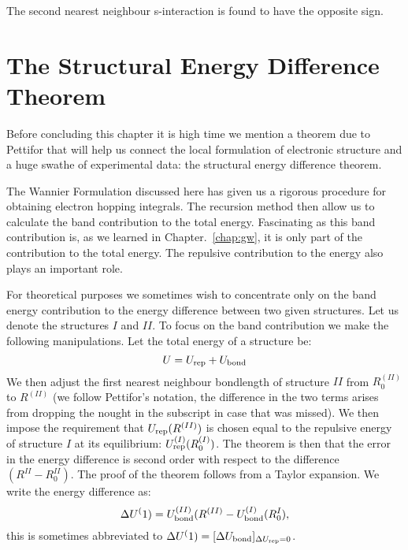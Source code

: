 The second nearest neighbour s-interaction is found to have the opposite sign.

\section{The Structural Energy Difference Theorem}
\label{sec:structendiff}
Before concluding this chapter it is high time we mention a theorem due to Pettifor
that will help us connect the local formulation of electronic structure and
a huge swathe of experimental data: the structural energy difference theorem. 

The Wannier Formulation discussed here has given
us a rigorous procedure for obtaining electron hopping integrals.
The recursion method then allow us to calculate the band contribution to the total energy.
Fascinating as this band contribution is, as we learned in Chapter.~\ref{chap:gw}, 
it is only part of the contribution to the total energy. The repulsive contribution to the energy
also plays an important role. 

For theoretical purposes we sometimes wish to concentrate only on the band energy 
contribution to the energy difference between two given structures. 
Let us denote the structures $I$ and $II$. To focus on the band contribution we make
the following manipulations. Let the total energy of a structure be:
%
\begin{equation}
U = U_{\rm rep} + U_{\rm bond}
\end{equation}
%
We then adjust the first nearest neighbour bondlength of structure $II$ from
$R^{(II)}_{0}$ to $R^{(II)}$ (we follow Pettifor's notation, the difference in the two terms
arises from dropping the nought in the subscript in case that was missed). 
We then impose the requirement that $U_{\rm rep}(R^{(II)})$ is chosen 
equal to the repulsive energy of structure $I$ at its equilibrium: $U^{(I)}_{\rm rep}(R^{(I)}_0)$.
The theorem is then that the error in the energy difference is second order with respect to the 
difference $(R^{II} - R^{II}_{0})$. The proof of the theorem follows from a Taylor expansion. 
We write the energy difference as:
%
\begin{equation}
\Delta U^(1) = U^{(II)}_{\rm bond}(R^{(II)} - U_{\rm bond}^{(I)}(R^{I}_{0}),
\end{equation}
%
this is sometimes abbreviated to $\Delta U^(1) = [\Delta U_{\rm bond}]_{\Delta U_{\rm rep}=0}$.

